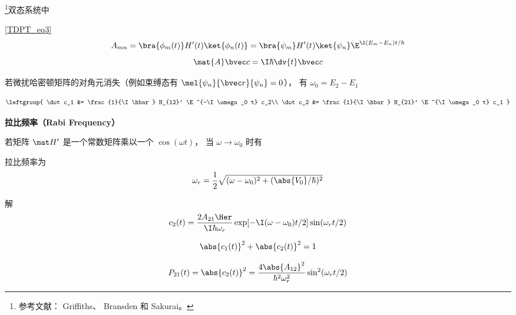
\begin{issues}
\issueDraft
\end{issues}

\footnote{参考文献： Griffiths\cite{GriffQ}、 Bransden\cite{Bransden} 和 Sakurai\cite{Sakurai}。}双态系统中

\autoref{TDPT_eq3}~
\begin{equation}
A_{mn} = \bra{\phi_m(t)} H'(t) \ket{\phi_n(t)} = \bra{\psi_m} H'(t) \ket{\psi_n} \E^{\I(E_m-E_n)t/\hbar}
\end{equation}
\begin{equation}
\mat {A} \bvec c = \I\hbar \dv{t} \bvec c
\end{equation}

若微扰哈密顿矩阵的对角元消失（例如束缚态有 $\mel{\psi_n}{\bvec r}{\psi_n} = 0$）， 有 $\omega_0 = E_2 - E_1$


\begin{equation}
\leftgroup{
\dot c_1 &= \frac{1}{\I \hbar} H_{12}' \E^{-\I\omega_0 t} c_2\\
\dot c_2 &= \frac{1}{\I \hbar} H_{21}' \E^{\I\omega_0 t} c_1
}\end{equation}

\textbf{拉比频率（Rabi Frequency）}

若矩阵 $\mat H'$ 是一个常数矩阵乘以一个 $\cos(\omega t)$， 当 $\omega \to \omega_0$ 时有


拉比频率为
\begin{equation}
\omega_r = \frac{1}{2} \sqrt{(\omega - \omega_0)^2 + (\abs{V_0}/\hbar)^2}
\end{equation}

解
\begin{equation}
c_2(t) = \frac{2A_{21}\Her}{\I \hbar \omega_r} \exp[-\I (\omega - \omega_0) t / 2] \sin(\omega_r t/2)
\end{equation}


\begin{equation}
\abs{c_1(t)}^2 + \abs{c_2(t)}^2 = 1
\end{equation}

\begin{equation}
P_{21}(t) = \abs{c_2(t)}^2 = \frac{4\abs{A_{12}}^2}{\hbar^2 \omega_r^2} \sin^2(\omega_r t/2)
\end{equation}
